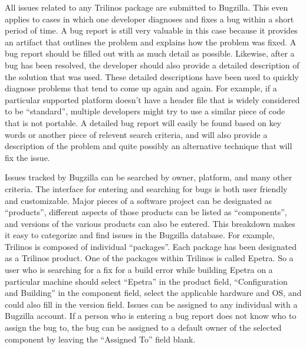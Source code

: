 \documentclass[12pt,relax]{article}
\begin{document}
All issues related to any Trilinos package are submitted to Bugzilla.  This 
even applies to cases in which 
one developer diagnoses and fixes a bug within a short period of time.  A bug 
report is still very valuable in this case because it provides an artifact 
that outlines the problem and explains how the problem was fixed.  A bug 
report should be filled out with as much detail as possible.  Likewise, after 
a bug has been resolved, the developer should also provide a detailed 
description of the solution that was used.  These detailed descriptions have 
been used to quickly diagnose problems that tend to come up again and again.
For example, if a particular supported platform doesn't have a header file 
that is widely considered to be ``standard'', multiple developers might try 
to use a similar piece of code that is not portable.  A detailed bug report 
will easily be found based on key words or another piece of relevent search 
criteria, and will also provide a description of the problem and quite 
possibly an alternative technique that will fix the issue. 

Issues tracked by Bugzilla can be searched by owner, platform, and many other 
criteria.  The 
interface for entering and searching for bugs is both user friendly and 
customizable.  Major pieces of a software project can be 
designated as ``products'', different aspects of those products can be 
listed as ``components'', and versions of the various products can also be 
entered.  This breakdown makes it easy to categorize and find issues in the 
Bugzilla database.  For example, Trilinos is composed of individual 
``packages''.  Each package has been designated as a Trilinos product.  One of 
the packages within Trilinos is called Epetra.  So a user who is searching for 
a fix for a build error while building Epetra on a particular 
machine should select ``Epetra'' in the product field, ``Configuration and 
Building'' in the component field, select the applicable hardware and OS, and
could also fill in the version field.  Issues can be assigned to any 
individual with a Bugzilla account.  If a 
person who is entering a bug report does not know who to assign the bug to,
the bug can be assigned to a default owner of the selected component 
by leaving the ``Assigned To'' field blank.  
\end{document}
